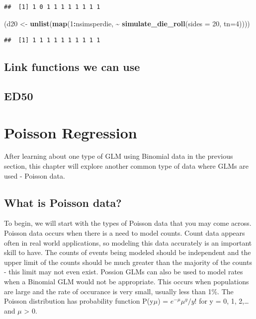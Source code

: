 \documentclass[
]{book}
\newenvironment{Shaded}{\begin{snugshade}}{\end{snugshade}}
\newcommand{\DataTypeTok}[1]{\textcolor[rgb]{0.13,0.29,0.53}{#1}}
\newcommand{\DecValTok}[1]{\textcolor[rgb]{0.00,0.00,0.81}{#1}}
\newcommand{\KeywordTok}[1]{\textcolor[rgb]{0.13,0.29,0.53}{\textbf{#1}}}
\newcommand{\NormalTok}[1]{#1}
\newcommand{\OperatorTok}[1]{\textcolor[rgb]{0.81,0.36,0.00}{\textbf{#1}}}
\newcommand{\StringTok}[1]{\textcolor[rgb]{0.31,0.60,0.02}{#1}}
\begin{document}
\begin{verbatim}
##  [1] 1 0 1 1 1 1 1 1 1 1
\end{verbatim}

\begin{Shaded}
\begin{Highlighting}[]
\NormalTok{(d20 \textless{}{-}}\StringTok{ }\KeywordTok{unlist}\NormalTok{(}\KeywordTok{map}\NormalTok{(}\DecValTok{1}\OperatorTok{:}\NormalTok{nsimsperdie, }\OperatorTok{\textasciitilde{}}\StringTok{ }\KeywordTok{simulate\_die\_roll}\NormalTok{(}\DataTypeTok{sides =} \DecValTok{20}\NormalTok{, }\DataTypeTok{tn=}\DecValTok{4}\NormalTok{))))}
\end{Highlighting}
\end{Shaded}

\begin{verbatim}
##  [1] 1 1 1 1 1 1 1 1 1 1
\end{verbatim}

\hypertarget{link-functions-we-can-use}{%
\section{Link functions we can use}\label{link-functions-we-can-use}}

\hypertarget{ed50}{%
\section{ED50}\label{ed50}}

\hypertarget{poisson-regression}{%
\chapter{Poisson Regression}\label{poisson-regression}}

After learning about one type of GLM using Binomial data in the previous section, this chapter will explore another common type of data where GLMs are used - Poisson data.

\hypertarget{what-is-poisson-data}{%
\section{What is Poisson data?}\label{what-is-poisson-data}}

To begin, we will start with the types of Poisson data that you may come across. Poisson data occurs when there is a need to model counts. Count data appears often in real world applications, so modeling this data accurately is an important skill to have. The counts of events being modeled should be independent and the upper limit of the counts should be much greater than the majority of the counts - this limit may not even exist. Possion GLMs can also be used to model rates when a Binomial GLM would not be appropriate. This occurs when populations are large and the rate of occurance is very small, usually less than 1\%. The Poisson distribution has probability function P(y\textbar{}\(\mu\)) = \(e^{-\mu}\mu^y/y!\) for y = 0, 1, 2,\ldots{} and \(\mu\) \textgreater{} 0.
\end{document}
